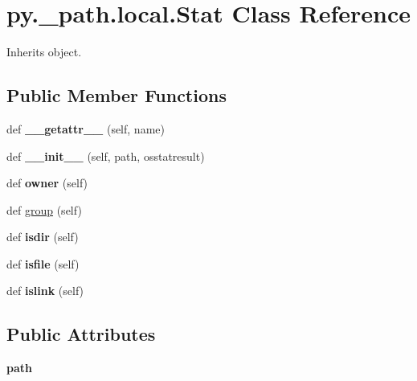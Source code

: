 \hypertarget{classpy_1_1__path_1_1local_1_1_stat}{}\section{py.\+\_\+path.\+local.\+Stat Class Reference}
\label{classpy_1_1__path_1_1local_1_1_stat}


Inherits object.

\subsection*{Public Member Functions}
\begin{DoxyCompactItemize}
\item 
\mbox{\label{classpy_1_1__path_1_1local_1_1_stat_ab0d87e0a8bdea9fb83d7753b8b5f656f}} 
def {\bfseries \+\_\+\+\_\+getattr\+\_\+\+\_\+} (self, name)
\item 
\mbox{\label{classpy_1_1__path_1_1local_1_1_stat_a5a68d41bbadcf4055e637e61598d2139}} 
def {\bfseries \+\_\+\+\_\+init\+\_\+\+\_\+} (self, path, osstatresult)
\item 
\mbox{\label{classpy_1_1__path_1_1local_1_1_stat_a36ddb34d219cb0bbe5ea37cc478e173a}} 
def {\bfseries owner} (self)
\item 
def \hyperlink{classpy_1_1__path_1_1local_1_1_stat_ad794bcdf382965b984801464d1b9d153}{group} (self)
\item 
\mbox{\label{classpy_1_1__path_1_1local_1_1_stat_a08745994aca2f3a410370cbff9059e86}} 
def {\bfseries isdir} (self)
\item 
\mbox{\label{classpy_1_1__path_1_1local_1_1_stat_abfabd9c6a835abde4ad2a4c9e82caf29}} 
def {\bfseries isfile} (self)
\item 
\mbox{\label{classpy_1_1__path_1_1local_1_1_stat_a3e4a8b7e38f16d845c0ce5abe30c0233}} 
def {\bfseries islink} (self)
\end{DoxyCompactItemize}
\subsection*{Public Attributes}
\begin{DoxyCompactItemize}
\item 
\mbox{\label{classpy_1_1__path_1_1local_1_1_stat_a2de28aebeba484a0167bf07dc09a555a}} 
{\bfseries path}
\end{DoxyCompactItemize}


